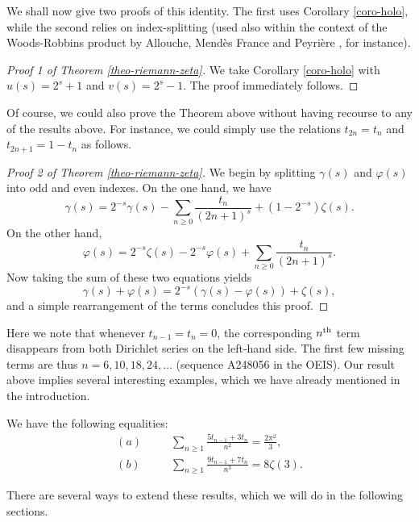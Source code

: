 \documentclass[12pt,reqno]{article}
\begin{document}
We shall now give two proofs of this identity. The first uses Corollary \ref{coro-holo}, while the second relies on index-splitting (used also within the context of the Woods-Robbins product by Allouche, Mend\`es France and Peyri\`ere \cite{Allouche00}, for instance).
\begin{proof} [Proof 1 of Theorem \ref{theo-riemann-zeta}]
	We take Corollary \ref{coro-holo} with $u(s) = 2^s+1$ and $v(s) = 2^s-1$. The proof immediately follows.
\end{proof}
Of course, we could also prove the Theorem above without having recourse to any of the results above. For instance, we could simply use the relations $t_{2n} = t_n$ and $t_{2n+1} = 1-t_n$ as follows.
\begin{proof}[Proof 2 of Theorem \ref{theo-riemann-zeta}]
	We begin by splitting $\gamma(s)$ and $\varphi(s)$ into odd and even indexes. On the one hand, we have
	$$
	\gamma(s) = 2^{-s} \gamma(s) - \sum_{n\geq0} \frac{t_{n}}{(2n+1)^s} + (1-2^{-s}) \zeta(s).
	$$
	On the other hand,
	$$
	\varphi(s) = 2^{-s} \zeta(s) - 2^{-s} \varphi(s) + \sum_{n\geq0} \frac{t_{n}}{(2n+1)^s}.
	$$
	Now taking the sum of these two equations yields
	$$
	\gamma(s) + \varphi(s) =  2^{-s} ( \gamma(s) - \varphi(s) ) + \zeta(s),
	$$
	and a simple rearrangement of the terms concludes this proof.
\end{proof}
Here we note that whenever $t_{n-1}=t_n=0$, the corresponding $n^{\rm th}$ term disappears from both Dirichlet series on the left-hand side. The first few missing terms are thus $n=6,10,18,24,\ldots$ (sequence A248056 in the OEIS). Our result above implies several interesting examples, which we have already mentioned in the introduction.
\begin{example}
	\rm{We have the following equalities:}
	\begin{align*}
		(a) \ \ \ \  \ \ \ \ &\sum_{n\geq1} \frac{5 t_{n-1} + 3 t_n}{n^2} = \frac{2 \pi^2}{3}, \\
		(b) \ \ \ \  \ \ \ \ &\sum_{n\geq1} \frac{9 t_{n-1} + 7 t_n}{n^3} = 8 \zeta(3).
	\end{align*}
\end{example}
There are several ways to extend these results, which we will do in the following sections.
\end{document}
